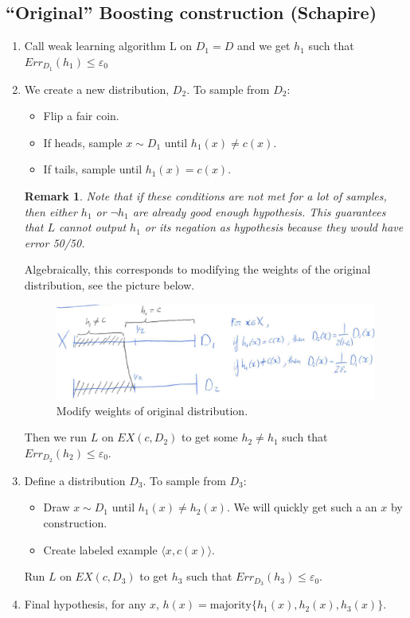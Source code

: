 \documentclass[12pt, letterpaper]{article}
\numberwithin{equation}{section} %
\newcommand{\ve}{\varepsilon}
\newtheorem{remark}[theorem]{Remark}
\theoremstyle{definition}
\theoremstyle{remark}
\begin{document}
\subsection{``Original'' Boosting construction (Schapire)}
\begin{enumerate}
\item Call weak learning algorithm L on $D_1 = D$ and we get $h_1$ such that $Err_{D_1}(h_1)\leq \ve_0$
\item We create a new distribution, $D_2$. To sample from $D_2$:
\begin{itemize}
\item Flip a fair coin.
\item If heads, sample $x\sim D_1$ until $h_1(x)\ne c(x)$.
\item If tails, sample until $h_1(x) = c(x)$. 
\end{itemize}
\begin{remark}
Note that if these conditions are not met for a lot of samples, then either $h_1$ or $\lnot h_1$ are already good enough hypothesis. This guarantees that $L$ cannot output $h_1$ or its negation as hypothesis because they would have error 50/50.
\end{remark}
Algebraically, this corresponds to modifying the weights of the original distribution, see the picture below.
\begin{figure}[H]
\centering
\includegraphics[width=0.6\linewidth]{../img/weights.png}
\caption{Modify weights of original distribution.}
\end{figure}
Then we run $L$ on $EX(c,D_2)$ to get some $h_2\ne h_1$ such that $Err_{D_2}(h_2)\leq \ve_0$.
\item Define a distribution $D_3$. To sample from $D_3$:
\begin{itemize}
\item Draw $x\sim D_1$ until $h_1(x) \ne h_2(x)$. We will quickly get such a an $x$ by construction.
\item Create labeled example $\langle x, c(x) \rangle$.
\end{itemize}
Run $L$ on $EX(c, D_3)$ to get $h_3$ such that $Err_{D_3}(h_3)\leq \ve_0$.
\item Final hypothesis, for any $x$, $h(x) = \mathrm{majority}\lbrace h_1(x), h_2(x), h_3(x)\rbrace$.
\end{enumerate}
\end{document}
